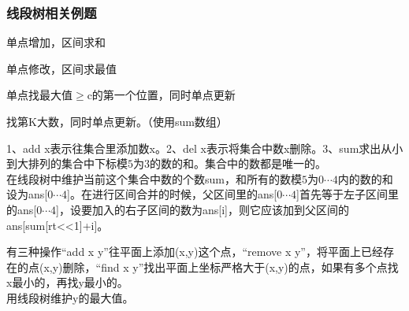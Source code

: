 \subsubsection{线段树相关例题}

单点增加，区间求和

单点修改，区间求最值

%
单点找最大值$\ge$c的第一个位置，同时单点更新

找第K大数，同时单点更新。（使用sum数组）

%
1、add x表示往集合里添加数x。2、del x表示将集合中数x删除。3、sum求出从小到大排列的集合中下标模$5$为$3$的数的和。集合中的数都是唯一的。\\
在线段树中维护当前这个集合中数的个数sum，和所有的数模$5$为$0\cdots4$内的数的和设为ans[$0\cdots4$]。在进行区间合并的时候，父区间里的ans[$0\cdots4$]首先等于左子区间里的ans[$0\cdots4$]，设要加入的右子区间的数为ans[i]，则它应该加到父区间的ans[sum[rt<<1]+i]。

有三种操作“add x y”往平面上添加(x,y)这个点，“remove x y”，将平面上已经存在的点(x,y)删除，“find x y”找出平面上坐标严格大于(x,y)的点，如果有多个点找x最小的，再找y最小的。\\
用线段树维护y的最大值。

%
%



